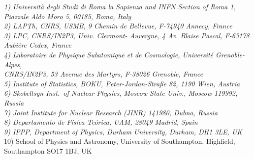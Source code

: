 \documentclass[12pt,a4paper]{article}
\begin{document}
{\it 
1) Universit\`a degli Studi di Roma la Sapienza and INFN Section of Roma 1,\\ Piazzale Aldo Moro 5, 00185, Roma, Italy\\
2) LAPTh, CNRS, USMB, 9 Chemin de Bellevue,  F-74940 Annecy, France\\
3) LPC, CNRS/IN2P3, Univ.  Clermont- Auvergne, 4 Av. Blaise Pascal, F-63178 Aubi\`ere Cedex,  France\\
4) {Laboratoire de Physique Subatomique et de Cosmologie}, Universit\'e Grenoble-Alpes,\\ CNRS/IN2P3, 53 Avenue des Martyrs, F-38026 Grenoble,  France\\
5) Institute of Statistics, BOKU, Peter-Jordan-Straße 82, 1190 Wien, Austria\\
6) Skobeltsyn Inst.\ of Nuclear Physics, Moscow State Univ., Moscow 119992, Russia\\
7) Joint Institute for Nuclear Research (JINR) 141980, Dubna,  Russia\\
8) Departamento de F\'isica Te\'orica, UAM, 28049 Madrid, Spain \\
9) IPPP, Department of Physics, Durham University, Durham, DH1 3LE,  UK}\\
10) School of Physics and Astronomy, University of Southampton, Highfield, Southampton SO17 1BJ, UK


\begin{abstract}
We give an up-to-date description of the \micro\ functions. Only the routines which are available for
the users are described.  Examples on how to use these functions
can be found in the sample main programs distributed with the code. 
\end{abstract}





\tableofcontents

\end{document}
